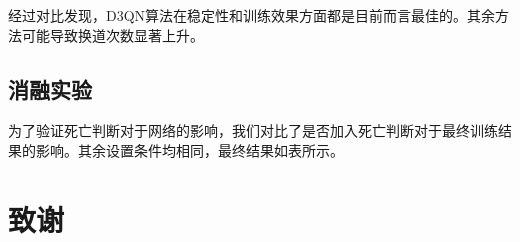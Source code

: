 \documentclass[letterpaper, 10 pt, conference]{ieeeconf}  %
\begin{document}
经过对比发现，D3QN算法在稳定性和训练效果方面都是目前而言最佳的。其余方法可能导致换道次数显著上升。
\subsection[]{消融实验}
为了验证死亡判断对于网络的影响，我们对比了是否加入死亡判断对于最终训练结果的影响。其余设置条件均相同，最终结果如表所示。

\addtolength{\textheight}{-1cm}   %









\section*{致谢}







\end{document}
